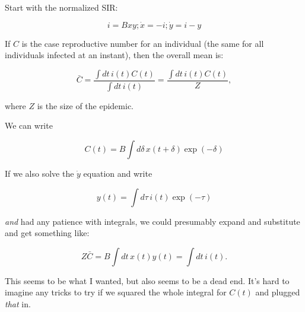 \documentclass[12pt]{article}
\begin{document}
Start with the normalized SIR:

$$ i = Bxy; \dot x = -i; \dot y = i-y $$

If $C$ is the case reproductive number for an individual (the same for all individuals infected at an instant), then the overall mean is:

$$
	\bar C 
	= \frac{\int{dt\, i(t) C(t)}}{\int{dt\, i(t)}}
	= \frac{\int{dt\, i(t) C(t)}}{Z}, 
$$

where $Z$ is the size of the epidemic.

We can write

$$C(t) = B \int{d\delta\, x(t+\delta) \exp(-\delta)}$$

If we also solve the $\dot y$ equation and write 

$$ y(t) = \int{d\tau\, i(t)\exp(-\tau)}$$

\emph{and} had any patience with integrals, we could presumably expand and substitute and get something like: 

$$
	Z \bar C  = B \int{dt\, x(t) y(t)} = \int{dt\, i(t)}.
$$

This seems to be what I wanted, but also seems to be a dead end. It's hard to imagine any tricks to try if we squared the whole integral for $C(t)$ and plugged \emph{that} in.
\end{document}
